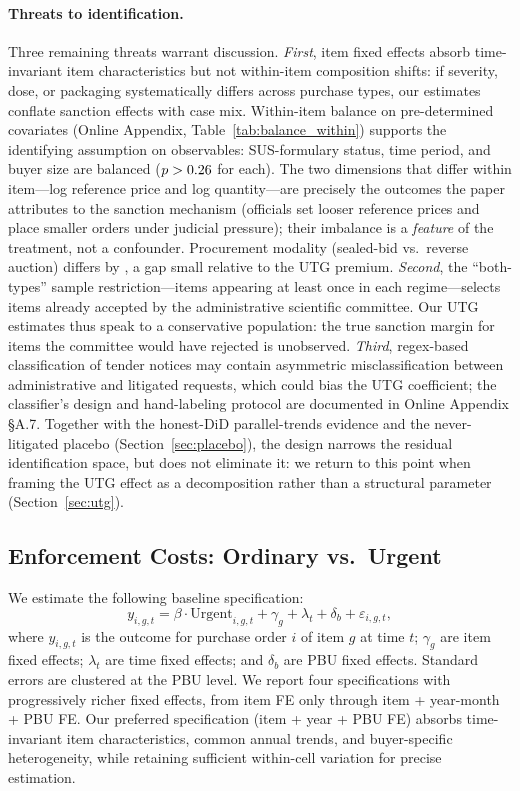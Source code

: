 \paragraph{Threats to identification.} Three remaining threats warrant discussion. \emph{First}, item fixed effects absorb time-invariant item characteristics but not within-item composition shifts: if severity, dose, or packaging systematically differs across purchase types, our estimates conflate sanction effects with case mix. Within-item balance on pre-determined covariates (Online Appendix, Table~\ref{tab:balance_within}) supports the identifying assumption on observables: SUS-formulary status, time period, and buyer size are balanced ($p>0.26$ for each). The two dimensions that differ within item---log reference price and log quantity---are precisely the outcomes the paper attributes to the sanction mechanism (officials set looser reference prices and place smaller orders under judicial pressure); their imbalance is a \emph{feature} of the treatment, not a confounder. Procurement modality (sealed-bid vs.\ reverse auction) differs by \BPbalModalityPP, a gap small relative to the \BPutgPctRange{} UTG premium. \emph{Second}, the ``both-types'' sample restriction---items appearing at least once in each regime---selects items already accepted by the administrative scientific committee. Our UTG estimates thus speak to a conservative population: the true sanction margin for items the committee would have rejected is unobserved. \emph{Third}, regex-based classification of tender notices may contain asymmetric misclassification between administrative and litigated requests, which could bias the UTG coefficient; the classifier's design and hand-labeling protocol are documented in Online Appendix \S A.7. Together with the honest-DiD parallel-trends evidence and the never-litigated placebo (Section~\ref{sec:placebo}), the design narrows the residual identification space, but does not eliminate it: we return to this point when framing the UTG effect as a decomposition rather than a structural parameter (Section~\ref{sec:utg}).

\subsection{Enforcement Costs: Ordinary vs.\ Urgent}

We estimate the following baseline specification:
\begin{equation}
\label{eq:baseline}
y_{i,g,t} = \beta \cdot \text{Urgent}_{i,g,t} + \gamma_g + \lambda_t + \delta_b + \varepsilon_{i,g,t},
\end{equation}
where $y_{i,g,t}$ is the outcome for purchase order $i$ of item $g$ at time $t$; $\gamma_g$ are item fixed effects; $\lambda_t$ are time fixed effects; and $\delta_b$ are PBU fixed effects. Standard errors are clustered at the PBU level. We report four specifications with progressively richer fixed effects, from item FE only through item + year-month + PBU FE. Our preferred specification (item + year + PBU FE) absorbs time-invariant item characteristics, common annual trends, and buyer-specific heterogeneity, while retaining sufficient within-cell variation for precise estimation.

